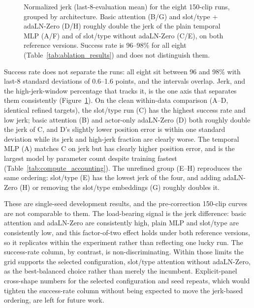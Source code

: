 \begin{figure}[t]
\centering
{}
\caption{Normalized jerk (last-8-evaluation mean) for the eight 150-clip
runs, grouped by architecture. Basic attention (B/G) and slot/type +
adaLN-Zero (D/H) roughly double the jerk of the plain temporal MLP (A/F) and
of slot/type without adaLN-Zero (C/E), on both reference versions. Success
rate is 96--98\% for all eight (Table~\ref{tab:ablation_results}) and does
not distinguish them.}\label{fig:ablation_jerk}
\end{figure}

Success rate does not separate the runs: all eight sit between 96 and 98\%
with last-8 standard deviations of 0.6--1.6 points, and the intervals
overlap. Jerk, and the high-jerk-window percentage that tracks it, is the one
axis that separates them consistently (Figure~\ref{fig:ablation_jerk}). On the clean within-data comparison
(A--D, identical refined targets), the slot/type run (C) has the highest
success rate and low jerk; basic attention (B) and actor-only adaLN-Zero (D)
both roughly double the jerk of C, and D's slightly lower position error is
within one standard deviation while its jerk and high-jerk fraction are
clearly worse. The temporal MLP (A) matches C on jerk but has clearly higher
position error, and is the largest model by parameter count despite training
fastest (Table~\ref{tab:compute_accounting}). The unrefined group (E--H)
reproduces the same ordering: slot/type (E) has the lowest jerk of the four,
and adding adaLN-Zero (H) or removing the slot/type embeddings (G) roughly
doubles it.

These are single-seed development results, and the pre-correction 150-clip
curves are not comparable to them. The load-bearing signal is the jerk
difference: basic attention and adaLN-Zero are consistently high, plain MLP
and slot/type are consistently low, and this factor-of-two effect holds under
both reference versions, so it replicates within the experiment rather than
reflecting one lucky run. The success-rate column, by contrast, is
non-discriminating.
Within those limits the grid supports the selected configuration, slot/type
attention without adaLN-Zero, as the best-balanced choice rather than merely
the incumbent. Explicit-panel cross-shape numbers for the selected
configuration and seed repeats, which would tighten the success-rate column
without being expected to move the jerk-based ordering, are left for future
work.

